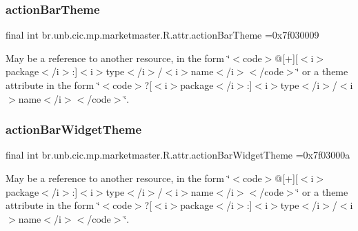 \subsubsection{\texorpdfstring{action\+Bar\+Theme}{actionBarTheme}}
{\footnotesize\ttfamily final int br.\+unb.\+cic.\+mp.\+marketmaster.\+R.\+attr.\+action\+Bar\+Theme =0x7f030009\hspace{0.3cm}{\ttfamily [static]}}

May be a reference to another resource, in the form \char`\"{}$<$code$>$@\mbox{[}+\mbox{]}\mbox{[}$<$i$>$package$<$/i$>$\+:\mbox{]}$<$i$>$type$<$/i$>$/$<$i$>$name$<$/i$>$$<$/code$>$\char`\"{} or a theme attribute in the form \char`\"{}$<$code$>$?\mbox{[}$<$i$>$package$<$/i$>$\+:\mbox{]}$<$i$>$type$<$/i$>$/$<$i$>$name$<$/i$>$$<$/code$>$\char`\"{}. \mbox{\label{classbr_1_1unb_1_1cic_1_1mp_1_1marketmaster_1_1R_1_1attr_ab05bcb33249e96322416c8d47d569507}} 
\subsubsection{\texorpdfstring{action\+Bar\+Widget\+Theme}{actionBarWidgetTheme}}
{\footnotesize\ttfamily final int br.\+unb.\+cic.\+mp.\+marketmaster.\+R.\+attr.\+action\+Bar\+Widget\+Theme =0x7f03000a\hspace{0.3cm}{\ttfamily [static]}}

May be a reference to another resource, in the form \char`\"{}$<$code$>$@\mbox{[}+\mbox{]}\mbox{[}$<$i$>$package$<$/i$>$\+:\mbox{]}$<$i$>$type$<$/i$>$/$<$i$>$name$<$/i$>$$<$/code$>$\char`\"{} or a theme attribute in the form \char`\"{}$<$code$>$?\mbox{[}$<$i$>$package$<$/i$>$\+:\mbox{]}$<$i$>$type$<$/i$>$/$<$i$>$name$<$/i$>$$<$/code$>$\char`\"{}. \mbox{\label{classbr_1_1unb_1_1cic_1_1mp_1_1marketmaster_1_1R_1_1attr_a4946577441d74ba9528ca19abd1d27bb}} 
